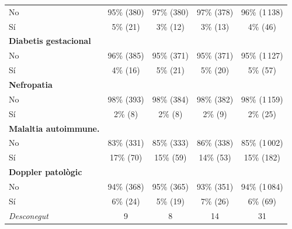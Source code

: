 \documentclass[../main.tex]{subfiles}
\begin{document}
\begin{scriptsize}
\begin{longtable}{lcccc}
          \hspace{1em}No        & 95\% (380)     & 97\% (380)       & 97\% (378)        & 96\% (1\,138) \\
          \hspace{1em}Sí        & 5\% (21)       & 3\% (12)         & 3\% (13)          & 4\% (46)      \\
          \addlinespace
          \textbf{Diabetis gestacional}       &                &                  &                   &               \\
          \hspace{1em}No        & 96\% (385)     & 95\% (371)       & 95\% (371)        & 95\% (1\,127) \\
          \hspace{1em}Sí        & 4\% (16)       & 5\% (21)         & 5\% (20)          & 5\% (57)      \\
          \addlinespace
          \textbf{Nefropatia}   &                &                  &                   &               \\
          \hspace{1em}No        & 98\% (393)     & 98\% (384)       & 98\% (382)        & 98\% (1\,159) \\
          \hspace{1em}Sí        & 2\% (8)        & 2\% (8)          & 2\% (9)           & 2\% (25)      \\
          \addlinespace
          \textbf{Malaltia autoimmune.}     &                &                  &                   &               \\
          \hspace{1em}No        & 83\% (331)     & 85\% (333)       & 86\% (338)        & 85\% (1\,002) \\
          \hspace{1em}Sí        & 17\% (70)      & 15\% (59)        & 14\% (53)         & 15\% (182)    \\
          \addlinespace
          \textbf{Doppler patològic}  &                &                  &                   &               \\
          \hspace{1em}No        & 94\% (368)     & 95\% (365)       & 93\% (351)        & 94\% (1\,084) \\
          \hspace{1em}Sí        & 6\% (24)       & 5\% (19)         & 7\% (26)          & 6\% (69)      \\
          \hspace{1em}\textit{Desconegut}   & 9              & 8                & 14                & 31            \\

\end{longtable}
\end{scriptsize}
\end{document}
